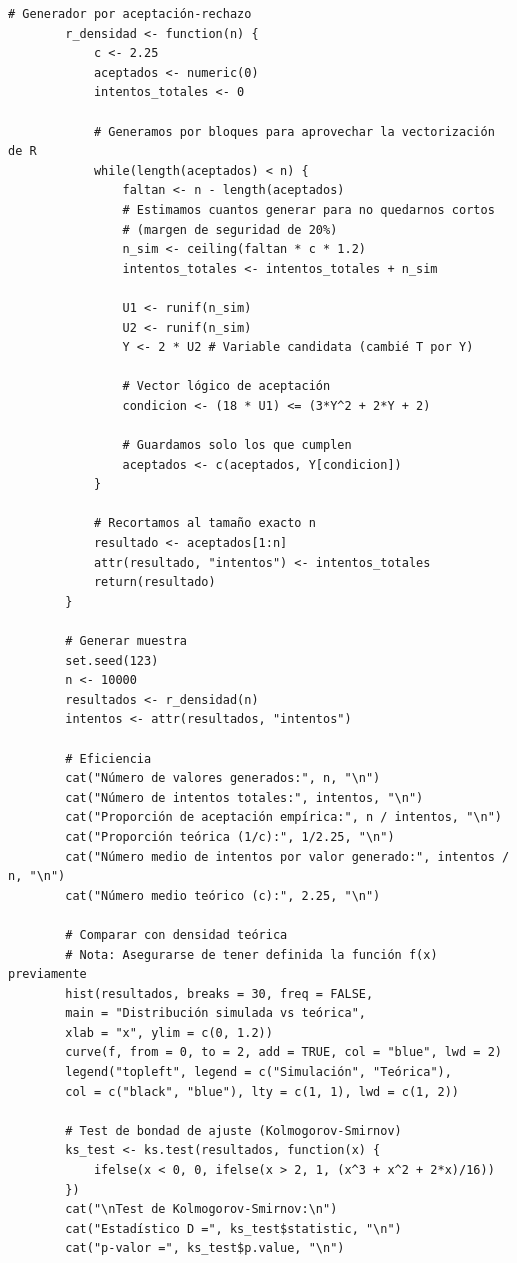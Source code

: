\documentclass[12pt, a4paper]{article}
\begin{document}
	\begin{lstlisting}[caption={Simulación por Aceptación y Rechazo en R}]
		# Generador por aceptación-rechazo
		r_densidad <- function(n) {
			c <- 2.25
			aceptados <- numeric(0)
			intentos_totales <- 0
			
			# Generamos por bloques para aprovechar la vectorización de R
			while(length(aceptados) < n) {
				faltan <- n - length(aceptados)
				# Estimamos cuantos generar para no quedarnos cortos 
				# (margen de seguridad de 20%)
				n_sim <- ceiling(faltan * c * 1.2) 
				intentos_totales <- intentos_totales + n_sim
				
				U1 <- runif(n_sim)
				U2 <- runif(n_sim)
				Y <- 2 * U2 # Variable candidata (cambié T por Y)
				
				# Vector lógico de aceptación
				condicion <- (18 * U1) <= (3*Y^2 + 2*Y + 2)
				
				# Guardamos solo los que cumplen
				aceptados <- c(aceptados, Y[condicion])
			}
			
			# Recortamos al tamaño exacto n
			resultado <- aceptados[1:n]
			attr(resultado, "intentos") <- intentos_totales
			return(resultado)
		}
		
		# Generar muestra
		set.seed(123)
		n <- 10000
		resultados <- r_densidad(n)
		intentos <- attr(resultados, "intentos")
		
		# Eficiencia
		cat("Número de valores generados:", n, "\n")
		cat("Número de intentos totales:", intentos, "\n")
		cat("Proporción de aceptación empírica:", n / intentos, "\n")
		cat("Proporción teórica (1/c):", 1/2.25, "\n")
		cat("Número medio de intentos por valor generado:", intentos / n, "\n")
		cat("Número medio teórico (c):", 2.25, "\n")
		
		# Comparar con densidad teórica
		# Nota: Asegurarse de tener definida la función f(x) previamente
		hist(resultados, breaks = 30, freq = FALSE, 
		main = "Distribución simulada vs teórica",
		xlab = "x", ylim = c(0, 1.2))
		curve(f, from = 0, to = 2, add = TRUE, col = "blue", lwd = 2)
		legend("topleft", legend = c("Simulación", "Teórica"), 
		col = c("black", "blue"), lty = c(1, 1), lwd = c(1, 2))
		
		# Test de bondad de ajuste (Kolmogorov-Smirnov)
		ks_test <- ks.test(resultados, function(x) {
			ifelse(x < 0, 0, ifelse(x > 2, 1, (x^3 + x^2 + 2*x)/16))
		})
		cat("\nTest de Kolmogorov-Smirnov:\n")
		cat("Estadístico D =", ks_test$statistic, "\n")
		cat("p-valor =", ks_test$p.value, "\n")
	\end{lstlisting}
	
\end{document}
